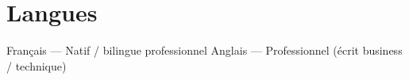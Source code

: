 \section{Langues}

{\small Fran\c{c}ais --- Natif / bilingue professionnel \quad\textbar\quad
Anglais --- Professionnel (\'ecrit business / technique)}
